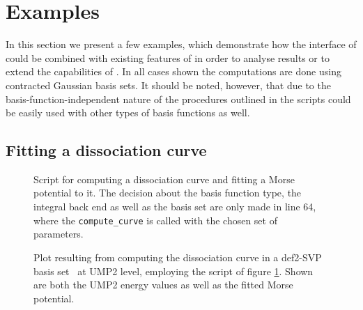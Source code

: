 \newcommand{\scipy}{\texttt{scipy}\xspace}

\section{Examples}
\label{sec:MolsturmExamples}

In this section we present a few examples,
which demonstrate how the \python interface of \molsturm
could be combined with existing features of \python
in order to analyse results or to extend the capabilities of \molsturm.
In all cases shown the computations are done using contracted
Gaussian basis sets.
It should be noted, however,
that due to the basis-function-independent nature of \molsturm
the procedures outlined in the scripts could be easily used
with other types of basis functions as well.

\subsection{Fitting a dissociation curve}
\label{sec:ex:data}

\newcommand{\ldict}{59--63\xspace}
\newcommand{\lcall}{64\xspace}
\newcommand{\lextract}{34\xspace}

\begin{figure}
	\centering
	\begin{minipage}{0.58\textwidth}
	
	\end{minipage}
	\caption[\python script computing a  dissociation curve]{
		Script for computing a  dissociation curve
		and fitting a Morse potential to it.
		The decision about the basis function type, the integral back end
		as well as the basis set are only made in line \lcall,
		where the \texttt{compute\_curve} is called with the chosen
		set of parameters.
	}
	\label{fig:codeDissociation}
\end{figure}

\begin{figure}
	\centering
	\caption[Result from calling the python script of figure \ref{fig:codeDissociation}]{
		Plot resulting from computing the 
		dissociation curve in a def2-SVP basis set~\cite{Weigend2005}
		at UMP2 level,
		employing the script of figure \ref{fig:codeDissociation}.
		Shown are both the UMP2 energy values as well as the fitted
		Morse potential.}
	\label{fig:dissociation}
\end{figure}

